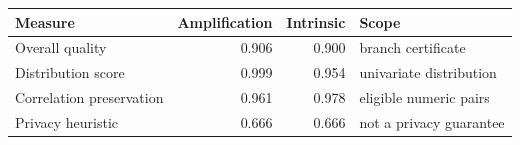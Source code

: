 \AccessibleTableHeaderRow
\begin{tabular}{@{}lrrl@{}}
\toprule
Measure & Amplification & Intrinsic & Scope \\
\midrule
Overall quality & 0.906 & 0.900 & branch certificate \\
Distribution score & 0.999 & 0.954 & univariate distribution \\
Correlation preservation & 0.961 & 0.978 & eligible numeric pairs \\
Privacy heuristic & 0.666 & 0.666 & not a privacy guarantee \\
\bottomrule
\end{tabular}
